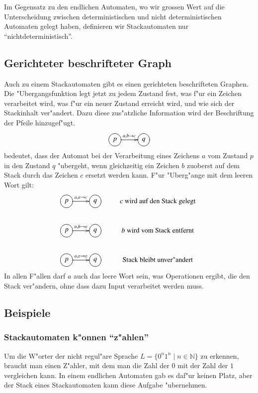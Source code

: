 Im Gegensatz zu den endlichen Automaten, wo wir grossen Wert auf die
Unterscheidung zwischen deterministischen und nicht deterministischen
Automaten gelegt haben, definieren wir Stackautomaten nur
``nichtdeterministisch''.

\subsection{Gerichteter beschrifteter Graph}
Auch zu einem Stackautomaten gibt es einen gerichteten beschrifteten
Graphen. Die "Ubergangsfunktion legt jetzt zu jedem Zustand 
fest, was f"ur ein Zeichen verarbeitet wird, was f"ur ein
neuer Zustand erreicht wird, und wie sich der Stackinhalt
ver"andert.
Dazu diese zus"atzliche Information wird der Beschriftung der Pfeile
hinzugef"ugt.
\[
\xymatrix{
*++[o][F]{p}\ar[r]^{a,b\to c}
	&*++[o][F]{q}
}
\]
bedeutet, dass der Automat bei der Verarbeitung eines Zeichens $a$
vom Zustand $p$ in den Zustand $q$ "ubergeht, wenn gleichzeitig
ein Zeichen $b$ zuoberst auf dem Stack durch das Zeichen $c$
ersetzt werden kann. F"ur "Uberg"ange mit dem leeren Wort gilt:
\[
\xymatrix{
*++[o][F]{p}\ar[r]^{a,\varepsilon\to c}
	&*++[o][F]{q}
		&\text{$c$ wird auf den Stack gelegt}
\\
*++[o][F]{p}\ar[r]^{a,b\to\varepsilon}
	&*++[o][F]{q}
		&\text{$b$ wird vom Stack entfernt}
\\
*++[o][F]{p}\ar[r]^{a,\varepsilon\to\varepsilon}
	&*++[o][F]{q}
		&\text{Stack bleibt unver"andert}
}
\]
In allen F"allen darf $a$ auch das leere Wort sein, was Operationen
ergibt, die den Stack ver"andern, ohne dass dazu Input verarbeitet werden
muss.


\subsection{Beispiele}
\subsubsection{Stackautomaten k"onnen ``z"ahlen''}
Um die W"orter der nicht regul"are Sprache $L=\{0^n1^n\;|\;n\in \mathbb N\}$
zu erkennen, braucht man einen Z"ahler, mit dem man die Zahl der $0$
mit der Zahl der $1$ vergleichen kann. In einem endlichen Automaten
gab es daf"ur keinen Platz, aber der Stack eines Stackautomaten kann
diese Aufgabe "ubernehmen.

